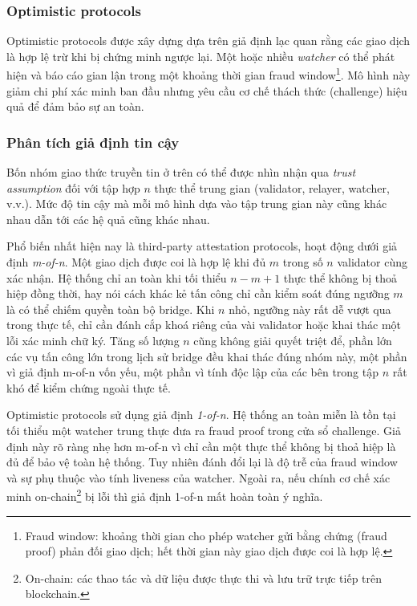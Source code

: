 \subsubsection*{Optimistic protocols}

Optimistic protocols được xây dựng dựa trên giả định lạc quan rằng các giao dịch là hợp lệ trừ
khi bị chứng minh ngược lại. 
Một hoặc nhiều \textit{watcher} có thể phát hiện và báo cáo gian lận
trong một khoảng thời gian fraud window\footnote{Fraud window: khoảng thời gian cho phép watcher gửi bằng chứng (fraud proof) phản đối giao dịch; hết thời gian này giao dịch được coi là hợp lệ.}.
Mô hình này giảm chi phí xác minh ban đầu nhưng yêu cầu cơ chế thách thức (challenge) 
hiệu quả để đảm bảo sự an toàn.

\subsubsection*{Phân tích giả định tin cậy}

Bốn nhóm giao thức truyền tin ở trên có thể được nhìn nhận qua \textit{trust assumption}
đối với tập hợp $n$ thực thể trung gian (validator, relayer, watcher, v.v.).
Mức độ tin cậy mà mỗi mô hình dựa vào tập trung gian này cũng khác nhau dẫn tới các hệ quả cũng khác nhau.

Phổ biến nhất hiện nay là third-party attestation protocols, hoạt động dưới giả định
\textit{m-of-n}. Một giao dịch được coi là hợp lệ khi đủ $m$ trong số $n$ validator
cùng xác nhận. Hệ thống chỉ an toàn khi tối thiểu $n - m + 1$ thực thể không bị
thoả hiệp đồng thời, hay nói cách khác kẻ tấn công chỉ cần kiểm soát đúng ngưỡng $m$
là có thể chiếm quyền toàn bộ bridge.
Khi $n$ nhỏ, ngưỡng này rất dễ vượt qua trong thực tế, chỉ cần đánh cắp khoá riêng
của vài validator hoặc khai thác một lỗi xác minh chữ ký. 
Tăng số lượng $n$ cũng không giải quyết triệt để, phần lớn các vụ tấn công lớn trong 
lịch sử bridge đều khai thác đúng nhóm này, một
phần vì giả định m-of-n vốn yếu, một phần vì tính độc lập của các bên trong tập $n$
rất khó để kiểm chứng ngoài thực tế.

Optimistic protocols sử dụng giả định \textit{1-of-n}. Hệ thống an toàn
miễn là tồn tại tối thiểu một watcher trung thực đưa ra fraud proof trong cửa sổ
challenge. Giả định này rõ ràng nhẹ hơn m-of-n vì chỉ cần một thực thể không bị thoả hiệp
là đủ để bảo vệ toàn hệ thống. Tuy nhiên đánh đổi lại là độ trễ của fraud window và sự
phụ thuộc vào tính liveness của watcher. Ngoài ra, nếu chính cơ chế xác minh 
on-chain\footnote{On-chain: các thao tác và dữ liệu được thực thi và lưu trữ trực tiếp trên blockchain.}
bị lỗi thì giả định 1-of-n
mất hoàn toàn ý nghĩa.

